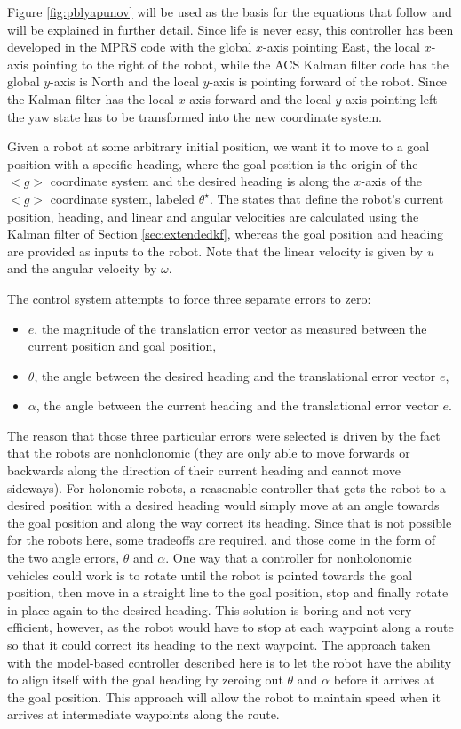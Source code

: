 Figure \ref{fig:pblyapunov} will be used as the basis for the equations that follow and will be explained in further detail. Since life is never easy, this controller has been developed in the MPRS code with the global $x$-axis pointing East, the local $x$-axis pointing to the right of the robot, while the ACS Kalman filter code has the global $y$-axis is North and the local $y$-axis is pointing forward of the robot. Since the Kalman filter has the local $x$-axis forward and the local $y$-axis pointing left the yaw state has to be transformed into the new coordinate system.

Given a robot at some arbitrary initial position, we want it to move to a goal position with a specific heading, where the goal position is the origin of the $<g>$ coordinate system and the desired heading is along the $x$-axis of the $<g>$ coordinate system, labeled $\theta^\star$. The states that define the robot's current position, heading, and linear and angular velocities are calculated using the Kalman filter of Section \ref{sec:extendedkf}, whereas the goal position and heading are provided as inputs to the robot. Note that the linear velocity is given by $u$ and the angular velocity by $\omega$.

The control system attempts to force three separate errors to zero:
\begin{itemize}
\item $e$, the magnitude of the translation error vector as measured between the current position and goal position,
\item $\theta$, the angle between the desired heading and the translational error vector $e$,
\item $\alpha$, the angle between the current heading and the translational error vector $e$.
\end{itemize}

The reason that those three particular errors were selected is driven by the fact that the robots are nonholonomic (they are only able to move forwards or backwards along the direction of their current heading and cannot move sideways). For holonomic robots, a reasonable controller that gets the robot to a desired position with a desired heading would simply move at an angle towards the goal position and along the way correct its heading. Since that is not possible for the robots here, some tradeoffs are required, and those come in the form of the two angle errors, $\theta$ and $\alpha$. One way that a controller for nonholonomic vehicles could work is to rotate until the robot is pointed towards the goal position, then move in a straight line to the goal position, stop and finally rotate in place again to the desired heading. This solution is boring and not very efficient, however, as the robot would have to stop at each waypoint along a route so that it could correct its heading to the next waypoint. The approach taken with the model-based controller described here is to let the robot have the ability to align itself with the goal heading by zeroing out $\theta$ and $\alpha$ before it arrives at the goal position. This approach will allow the robot to maintain speed when it arrives at intermediate waypoints along the route.

